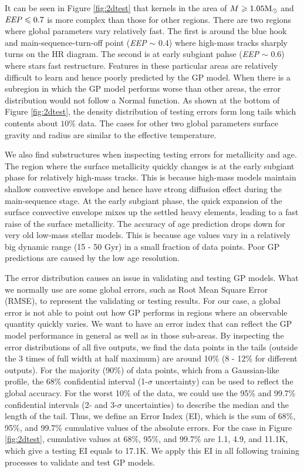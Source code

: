 It can be seen in Figure \ref{fig:2dtest} that kernels in the area of $M \geq 1.05 {\rm M_{\odot}}$ and ${\it EEP} \leq 0.7$ is more complex than those for other regions. 
%
There are two regions where global parameters vary relatively fast. The first is around the blue hook and main-sequence-turn-off point ({\it EEP} $\sim$ 0.4) where high-mass tracks sharply turns on the HR diagram. The second is at early subgiant pahse ({\it EEP} $\sim$ 0.6) where stars fast restructure. Features in these particular areas are relatively difficult to learn and hence poorly predicted by the GP model.  
%
When there is a subregion in which the GP model performs worse than other areas, the error distribution would not follow a Normal function. As shown at the bottom of Figure \ref{fig:2dtest}, the density distribution of testing errors form long tails which contents about $10\%$ data. The cases for other two global parameters surface gravity and radius are similar to the effective temperature.

We also find substructures when inspecting testing errors for metallicity and age. The region where the surface metallicity quickly changes is at the early subgiant phase for relatively high-mass tracks. This is because high-mass models maintain shallow convective envelope and hence have strong diffusion effect during the main-sequence stage. At the early subgiant phase, the quick expansion of the surface convective envelope mixes up the settled heavy elements, leading to a fast raise of the surface metallicity. 
%
The accuracy of age prediction drops down for very old low-mass stellar models. This is because age values vary in a relatively big dynamic range (15 - 50 Gyr) in a small fraction of data points. Poor GP predictions are caused by the low age resolution.         
 

The error distribution causes an issue in validating and testing GP models. What we normally use are some global errors, such as Root Mean Square Error (RMSE), to represent the validating or testing results. For our case, a global error is not able to point out how GP performs in regions where an observable quantity quickly varies. 
%
We want to have an error index that can reflect the GP model performance in general as well as in those sub-areas. By inspecting the error distributions of all five outputs, we find the data points in the tails (outside the 3 times of full width at half maximum) are around 10\% (8 - 12\% for different outputs).  For the majority (90\%) of data points, which from a Gaussian-like profile, the 68\% confidential interval (1-$\sigma$ uncertainty) can be used to reflect the global accuracy. For the worst 10\% of the data, we could use the 95\% and 99.7\% confidential intervals (2- and 3-$\sigma$ uncertainties) to describe the median and the length of the tail. Thus, we define an Error Index (EI), which is the sum of 68\%, 95\%, and 99.7\% cumulative values of the absolute errors. For the case in Figure \ref{fig:2dtest}, cumulative values at 68\%, 95\%, and 99.7\% are 1.1, 4.9, and 11.1K, which give a testing EI equals to 17.1K. We apply this EI in all following training processes to validate and test GP models. 

